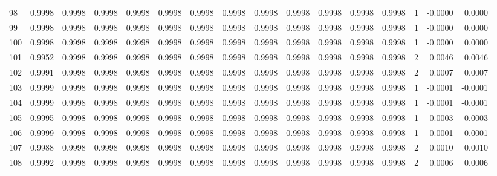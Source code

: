 \begin{tabular}{lrrrrrrrrrrrrrrr}
98  &      0.9998 &  0.9998 &  0.9998 &  0.9998 &  0.9998 &  0.9998 &  0.9998 &  0.9998 &  0.9998 &  0.9998 &   0.9998 &     0.9998 &      1 &                   -0.0000 &                     0.0000 \\
99  &      0.9998 &  0.9998 &  0.9998 &  0.9998 &  0.9998 &  0.9998 &  0.9998 &  0.9998 &  0.9998 &  0.9998 &   0.9998 &     0.9998 &      1 &                   -0.0000 &                     0.0000 \\
100 &      0.9998 &  0.9998 &  0.9998 &  0.9998 &  0.9998 &  0.9998 &  0.9998 &  0.9998 &  0.9998 &  0.9998 &   0.9998 &     0.9998 &      1 &                   -0.0000 &                     0.0000 \\
101 &      0.9952 &  0.9998 &  0.9998 &  0.9998 &  0.9998 &  0.9998 &  0.9998 &  0.9998 &  0.9998 &  0.9998 &   0.9998 &     0.9998 &      2 &                    0.0046 &                     0.0046 \\
102 &      0.9991 &  0.9998 &  0.9998 &  0.9998 &  0.9998 &  0.9998 &  0.9998 &  0.9998 &  0.9998 &  0.9998 &   0.9998 &     0.9998 &      2 &                    0.0007 &                     0.0007 \\
103 &      0.9999 &  0.9998 &  0.9998 &  0.9998 &  0.9998 &  0.9998 &  0.9998 &  0.9998 &  0.9998 &  0.9998 &   0.9998 &     0.9998 &      1 &                   -0.0001 &                    -0.0001 \\
104 &      0.9999 &  0.9998 &  0.9998 &  0.9998 &  0.9998 &  0.9998 &  0.9998 &  0.9998 &  0.9998 &  0.9998 &   0.9998 &     0.9998 &      1 &                   -0.0001 &                    -0.0001 \\
105 &      0.9995 &  0.9998 &  0.9998 &  0.9998 &  0.9998 &  0.9998 &  0.9998 &  0.9998 &  0.9998 &  0.9998 &   0.9998 &     0.9998 &      1 &                    0.0003 &                     0.0003 \\
106 &      0.9999 &  0.9998 &  0.9998 &  0.9998 &  0.9998 &  0.9998 &  0.9998 &  0.9998 &  0.9998 &  0.9998 &   0.9998 &     0.9998 &      1 &                   -0.0001 &                    -0.0001 \\
107 &      0.9988 &  0.9998 &  0.9998 &  0.9998 &  0.9998 &  0.9998 &  0.9998 &  0.9998 &  0.9998 &  0.9998 &   0.9998 &     0.9998 &      2 &                    0.0010 &                     0.0010 \\
108 &      0.9992 &  0.9998 &  0.9998 &  0.9998 &  0.9998 &  0.9998 &  0.9998 &  0.9998 &  0.9998 &  0.9998 &   0.9998 &     0.9998 &      2 &                    0.0006 &                     0.0006 \\

\end{tabular}
